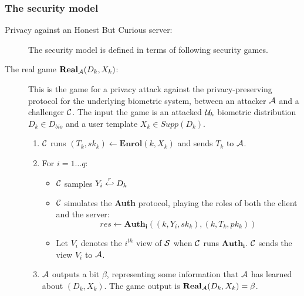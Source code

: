 \subsubsection{The security model}
\begin{description}
\item[Privacy against an Honest But Curious server:] The security model is defined in terms of following security games.

\item[The real game $\mathbf{Real}_{\mathcal{A}}(D_k,X_k)$:] This is the game for a privacy attack against the
  privacy-preserving protocol for the underlying biometric system, between an attacker $\mathcal{A}$ and a challenger
  $\mathcal{C}$. The input the game is an attacked $\mathcal{U}_k$ biometric distribution $D_k \in D_{bio}$ and a user
  template $X_k \in Supp(D_k)$.
  \begin{enumerate} %
  \item $\mathcal{C}$ runs $(T_k, sk_k) \gets \mathbf{Enrol}(k,X_k)$ and sends $T_k$ to $\mathcal{A}$.
  \item For $i = 1 \dots q$:
    \begin{itemize}
    \item $\mathcal{C}$ samples \(Y_{i} \stackrel{r}{\hookleftarrow} D_{k}\)
    \item $\mathcal{C}$ simulates the \textbf{Auth} protocol, playing the roles of both the client and the server:
      \[
        res \gets \mathbf{Auth_i}((k, Y_i, sk_k), (k, T_k, pk_k))
      \]
    \item Let $V_i$ denotes the $i^{th}$ view of $\mathcal{S}$ when $\mathcal{C}$ runs $\mathbf{Auth_i}$. $\mathcal{C}$
      sends the view $V_i$ to $\mathcal{A}$.
    \end{itemize}
  \item $\mathcal{A}$ outputs a bit $\beta$, representing some information that $\mathcal{A}$ has learned about
    $(D_k,X_k)$. The game output is $\mathbf{Real}_{\mathcal{A}}(D_k,X_k) = \beta$.
  \end{enumerate}


\end{description}

